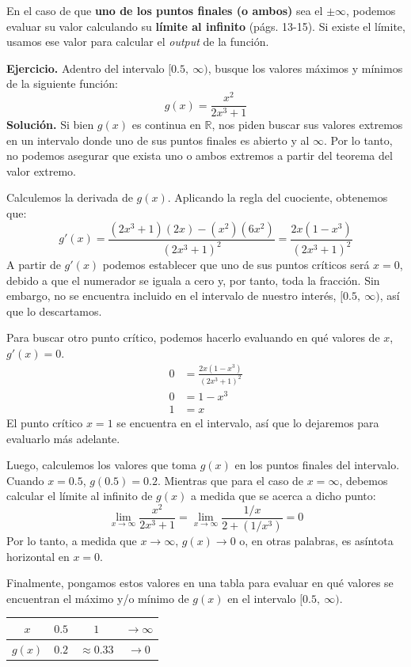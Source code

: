 \documentclass[12pt]{article}
\begin{document}
\newpage

En el caso de que \textbf{uno de los puntos finales (o ambos)} sea el $\pm \infty$, podemos evaluar su valor calculando su \textbf{límite al infinito} (págs. 13-15). Si existe el límite, usamos ese valor para calcular el \textit{output} de la función.

\textbf{Ejercicio.} \quad Adentro del intervalo $[0.5, \ \infty)$, busque los valores máximos y mínimos de la siguiente función:
\[
	g(x) = \frac{x^{2}}{2x^{3} + 1}
\]
\textbf{Solución.} \quad Si bien $g(x)$ es continua en $\mathbb{R}$, nos piden buscar sus valores extremos en un intervalo donde uno de sus puntos finales es abierto y al $\infty$. Por lo tanto, no podemos asegurar que exista uno o ambos extremos a partir del teorema del valor extremo.

Calculemos la derivada de $g(x)$. Aplicando la regla del cuociente, obtenemos que:
\[
g'(x) = \frac{(2x^{3} + 1)(2x) - (x^{2})(6x^{2})}{(2x^{3} + 1)^{2}}
	  = \frac{2x(1 - x^{3})}{(2x^{3} + 1)^{2}}
\]
A partir de $g'(x)$ podemos establecer que uno de sus puntos críticos será $x = 0$, debido a que el numerador se iguala a cero y, por tanto, toda la fracción. Sin embargo, no se encuentra incluido en el intervalo de nuestro interés, $[0.5, \ \infty)$, así que lo descartamos.

Para buscar otro punto crítico, podemos hacerlo evaluando en qué valores de $x$, $g'(x) = 0$.
\begin{align*}
0 &= \frac{2x(1 - x^{3})}{(2x^{3} + 1)^{2}} \\
0 &= 1 - x ^{3} \\
1 &= x
\end{align*}
El punto crítico $x = 1$ se encuentra en el intervalo, así que lo dejaremos para evaluarlo más adelante.

Luego, calculemos los valores que toma $g(x)$ en los puntos finales del intervalo. Cuando $x = 0.5$, $g(0.5) = 0.2$. Mientras que para el caso de $x = \infty$, debemos calcular el límite al infinito de $g(x)$ a medida que se acerca a dicho punto:
\[
\lim_{x \to \infty} \frac{x^{2}}{2x^{3} + 1} = 
\lim_{x \to \infty} \frac{1/x}{2 + (1/x^{3})} = 0
\]
Por lo tanto, a medida que $x \to \infty$, $g(x) \to 0$ o, en otras palabras, es asíntota horizontal en $x = 0$.

Finalmente, pongamos estos valores en una tabla para evaluar en qué valores se encuentran el máximo y/o mínimo de $g(x)$ en el intervalo $[0.5, \ \infty)$.

\begin{table}[hbt!]
\centering

\begin{tabular}{c | c c c}
$x$ & $0.5$ & $1$ & $\to \infty$ \\
\hline
$g(x)$ & $0.2$ & $\approx 0.33$ & $\to 0$
\end{tabular}

\end{table}
\end{document}
